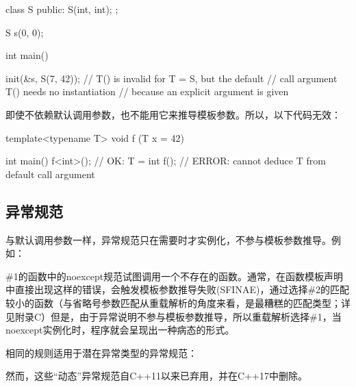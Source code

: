 \begin{cpp}
class S {
	public:
	S(int, int);
};

S s(0, 0);

int main()

{
	init(&s, S(7, 42)); // T() is invalid for T = S, but the default
	// call argument T() needs no instantiation
	// because an explicit argument is given
}
\end{cpp}

即使不依赖默认调用参数，也不能用它来推导模板参数。所以，以下代码无效：

\begin{cpp}
template<typename T>
void f (T x = 42)
{ }

int main()
{
	f<int>(); // OK: T = int
	f(); // ERROR: cannot deduce T from default call argument
}
\end{cpp}

\subsection{异常规范}

与默认调用参数一样，异常规范只在需要时才实例化，不参与模板参数推导。例如：


\#1的函数中的noexcept规范试图调用一个不存在的函数。通常，在函数模板声明中直接出现这样的错误，会触发模板参数推导失败(SFINAE)，通过选择\#2的匹配较小的函数（与省略号参数匹配从重载解析的角度来看，是最糟糕的匹配类型；详见附录C）但是，由于异常说明不参与模板参数推导，所以重载解析选择\#1，当noexcept实例化时，程序就会呈现出一种病态的形式。

相同的规则适用于潜在异常类型的异常规范：


然而，这些“动态”异常规范自C++11以来已弃用，并在C++17中删除。


















